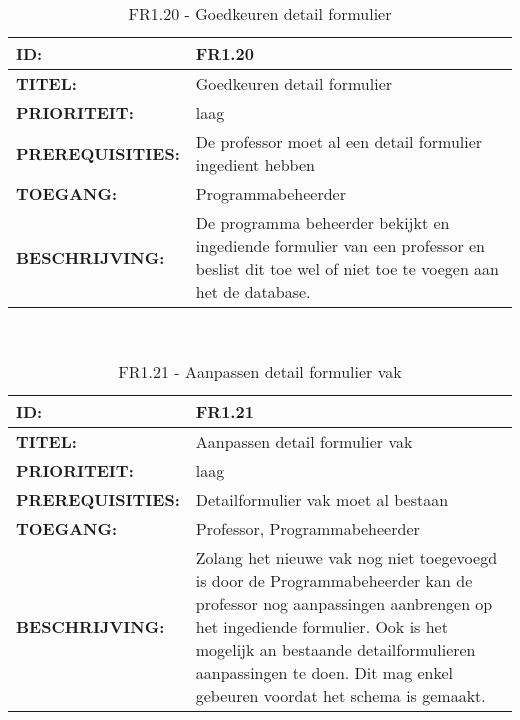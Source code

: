 \noindent\begin{table}[H]
            \begin{tabular}{l | p{10cm}}
                \textbf{ID:} & FR1.20 \\ \hline
                \textbf{TITEL:} & Goedkeuren detail formulier   \\ \hline
                \textbf{PRIORITEIT:} &  laag \\ \hline
                \textbf{PREREQUISITIES:} & De professor moet al een detail formulier ingedient hebben\\ \hline
                \textbf{TOEGANG:} & Programmabeheerder \\ \hline
                \textbf{BESCHRIJVING:} & De programma beheerder bekijkt en ingediende formulier van een professor en beslist dit toe wel of niet toe te voegen aan het de database. 
            \end{tabular}\\
            \caption{FR1.20 - Goedkeuren detail formulier  }
            \label{tab:FR1.20 - Goedkeuren detail formulier  }
        \end{table}

\noindent\begin{table}[H]
            \begin{tabular}{l | p{10cm}}
                \textbf{ID:} & FR1.21 \\ \hline
                \textbf{TITEL:} & Aanpassen detail formulier vak \\ \hline
                \textbf{PRIORITEIT:} &  laag \\ \hline
                \textbf{PREREQUISITIES:} & Detailformulier vak moet al bestaan\\ \hline
                \textbf{TOEGANG:} & Professor, Programmabeheerder \\ \hline
                \textbf{BESCHRIJVING:} & Zolang het nieuwe vak nog niet toegevoegd is door de Programmabeheerder kan de professor nog aanpassingen aanbrengen op het ingediende formulier. Ook is het mogelijk an bestaande detailformulieren aanpassingen te doen. Dit mag enkel gebeuren voordat het schema is gemaakt.\\ 
            \end{tabular}\\
            \caption{FR1.21 - Aanpassen detail formulier vak}
            \label{tab:FR1.21 - Aanpassen detail formulier vak}
        \end{table}

